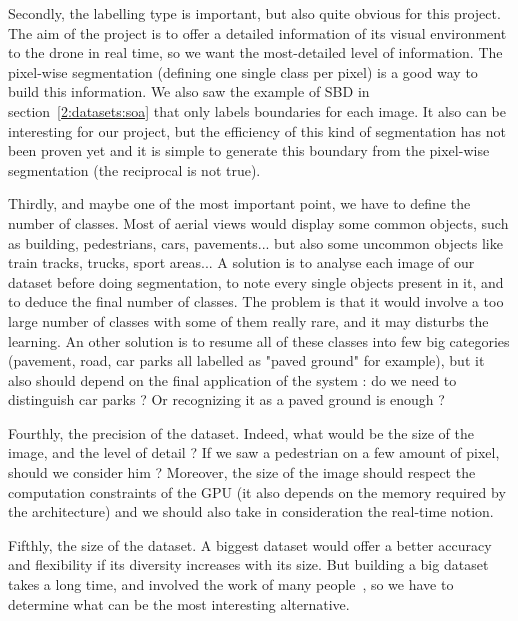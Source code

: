 Secondly, the labelling type is important, but also quite obvious for this project. The aim of the project is to offer a detailed information of its visual environment to the drone in real time, so we want the most-detailed level of information. The pixel-wise segmentation (defining one single class per pixel) is a good way to build this information. We also saw the example of SBD in section~\ref{2:datasets:soa} that only labels boundaries for each image. It also can be interesting for our project, but the efficiency of this kind of segmentation has not been proven yet and it is simple to generate this boundary from the pixel-wise segmentation (the reciprocal is not true).

Thirdly, and maybe one of the most important point, we have to define the number of classes. Most of aerial views would display some common objects, such as building, pedestrians, cars, pavements... but also some uncommon objects like train tracks, trucks, sport areas... A solution is to analyse each image of our dataset before doing segmentation, to note every single objects present in it, and to deduce the final number of classes. The problem is that it would involve a too large number of classes with some of them really rare, and it may disturbs the learning. An other solution is to resume all of these classes into few big categories (pavement, road, car parks all labelled as "paved ground" for example), but it also should depend on the final application of the system : do we need to distinguish car parks ? Or recognizing it as a paved ground is enough ?

Fourthly, the precision of the dataset. Indeed, what would be the size of the image, and the level of detail ? If we saw a pedestrian on a few amount of pixel, should we consider him ? Moreover, the size of the image should respect the computation constraints of the GPU (it also depends on the memory required by the architecture) and we should also take in consideration the real-time notion.

Fifthly, the size of the dataset. A biggest dataset would offer a better accuracy and flexibility if its diversity increases with its size. But building a big dataset takes a long time, and involved the work of many people~\cite{LIN14}, so we have to determine what can be the most interesting alternative.


